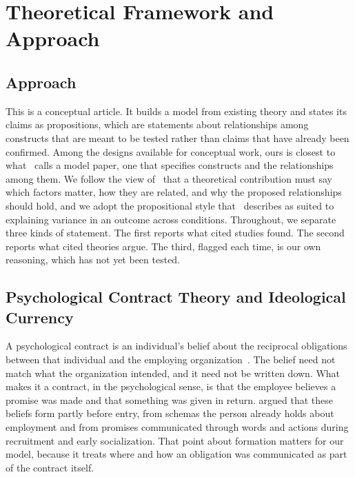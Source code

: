 \section{Theoretical Framework and Approach}
\subsection{Approach}

This is a conceptual article. It builds a model from existing theory and states its claims as propositions, which are statements about relationships among constructs that are meant to be tested rather than claims that have already been confirmed. Among the designs available for conceptual work, ours is closest to what~\citet{jaakkola2020designing} calls a model paper, one that specifies constructs and the relationships among them. We follow the view of~\citet{whetten1989constitutes} that a theoretical contribution must say which factors matter, how they are related, and why the proposed relationships should hold, and we adopt the propositional style that~\citet{cornelissen2017developing} describes as suited to explaining variance in an outcome across conditions. Throughout, we separate three kinds of statement. The first reports what cited studies found. The second reports what cited theories argue. The third, flagged each time, is our own reasoning, which has not yet been tested.

\subsection{Psychological Contract Theory and Ideological Currency}

A psychological contract is an individual's belief about the reciprocal obligations between that individual and the employing organization~\citep{rousseau1989psychological}. The belief need not match what the organization intended, and it need not be written down. What makes it a contract, in the psychological sense, is that the employee believes a promise was made and that something was given in return. \citet{rousseau2001schema} argued that these beliefs form partly before entry, from schemas the person already holds about employment and from promises communicated through words and actions during recruitment and early socialization. That point about formation matters for our model, because it treats where and how an obligation was communicated as part of the contract itself.


